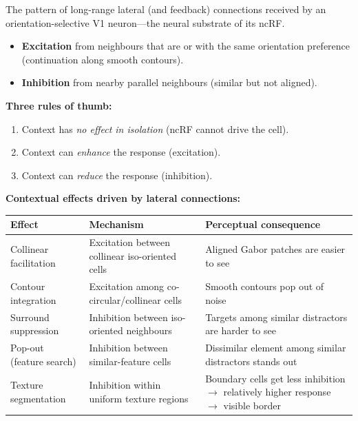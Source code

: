 \begin{defbox}
The pattern of long-range lateral (and feedback) connections received by an orientation-selective V1 neuron---the neural substrate of its ncRF.
\begin{itemize}
  \item \textbf{Excitation} from neighbours that are  or  with the same orientation preference (continuation along smooth contours).
  \item \textbf{Inhibition} from nearby  parallel neighbours (similar but not aligned).
\end{itemize}
\end{defbox}

\textbf{Three rules of thumb:}
\begin{enumerate}
  \item Context has \emph{no effect in isolation} (ncRF cannot drive the cell).
  \item Context can \emph{enhance} the response (excitation).
  \item Context can \emph{reduce} the response (inhibition).
\end{enumerate}

\separator

\textbf{Contextual effects driven by lateral connections:}

\begin{center}
\renewcommand{\arraystretch}{1.3}
\begin{tabular}{@{} l l p{7cm} @{}}
\toprule
\textbf{Effect} & \textbf{Mechanism} & \textbf{Perceptual consequence} \\
\midrule
Collinear facilitation & Excitation between collinear iso-oriented cells & Aligned Gabor patches are easier to see \\
Contour integration & Excitation among co-circular/collinear cells & Smooth contours pop out of noise \\
Surround suppression & Inhibition between iso-oriented neighbours & Targets among similar distractors are harder to see \\
Pop-out (feature search) & Inhibition between similar-feature cells & Dissimilar element among similar distractors stands out \\
Texture segmentation & Inhibition within uniform texture regions & Boundary cells get less inhibition $\rightarrow$ relatively higher response $\rightarrow$ visible border \\
\bottomrule
\end{tabular}
\end{center}

